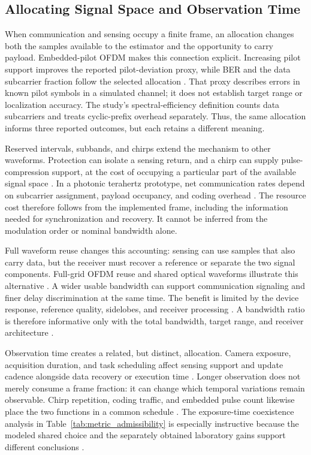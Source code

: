 \subsection{Allocating Signal Space and Observation Time}

When communication and sensing occupy a finite frame, an allocation changes
both the samples available to the estimator and the opportunity to carry
payload. Embedded-pilot OFDM makes this connection explicit. Increasing pilot
support improves the reported pilot-deviation proxy, while BER and the data
subcarrier fraction follow the selected allocation
\cite{OISAC_SCR00007}. That proxy describes errors in known pilot symbols in a
simulated channel; it does not establish target range or localization accuracy.
The study's spectral-efficiency definition counts data subcarriers and treats
cyclic-prefix overhead separately. Thus, the same allocation informs three
reported outcomes, but each retains a different meaning.

Reserved intervals, subbands, and chirps extend the mechanism to other
waveforms. Protection can isolate a sensing return, and a chirp can supply
pulse-compression support, at the cost of occupying a particular part of the
available signal space \cite{OISAC_SCR00344,OISAC_SCR00366}. In a photonic
terahertz prototype, net communication rates depend on subcarrier assignment,
payload occupancy, and coding overhead \cite{OISAC_SCR01054}. The resource
cost therefore follows from the implemented frame, including the information
needed for synchronization and recovery. It cannot be inferred from the
modulation order or nominal bandwidth alone.

Full waveform reuse changes this accounting: sensing can use samples that also
carry data, but the receiver must recover a reference or separate the two
signal components. Full-grid OFDM reuse and shared optical waveforms illustrate
this alternative \cite{OISAC_SCR00274,OISAC_SCR01115}. A wider usable
bandwidth can support communication signaling and finer delay discrimination
at the same time. The benefit is limited by the device response, reference
quality, sidelobes, and receiver processing
\cite{OISAC_SCR00965,OISAC_SCR00988,OISAC_SCR01000}. A bandwidth ratio is
therefore informative only with the total bandwidth, target range, and
receiver architecture \cite{OISAC_SCR00784}.

Observation time creates a related, but distinct, allocation. Camera exposure,
acquisition duration, and task scheduling affect sensing support and update
cadence alongside data recovery or execution time
\cite{OISAC_SCR00189,OISAC_SCR00273,OISAC_SCR00833}. Longer observation does
not merely consume a frame fraction: it can change which temporal variations
remain observable. Chirp repetition, coding traffic, and embedded pulse count
likewise place the two functions in a common schedule
\cite{OISAC_SCR01015,OISAC_SCR01034,OISAC_SCR01019}. The exposure-time
coexistence analysis in Table~\ref{tab:metric_admissibility} is especially
instructive because the modeled shared choice and the separately obtained
laboratory gains support different conclusions \cite{OISAC_SCR00273}.

